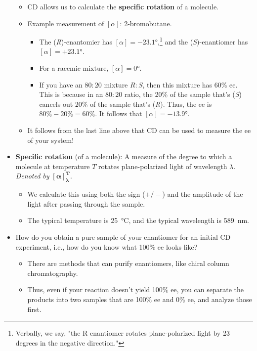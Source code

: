 \documentclass[../notes.tex]{subfiles}
\begin{document}
\begin{itemize}
\begin{itemize}
        \item CD allows us to calculate the \textbf{specific rotation} of a molecule.
        \item Example measurement of $[\alpha]$: 2-bromobutane.
        \begin{itemize}
            \item The (\emph{R})-enantomier has $[\alpha]=\ang{-23.1}$,\footnote{Verbally, we say, "the R enantiomer rotates plane-polarized light by 23 degrees in the negative direction."} and the (\emph{S})-enantiomer has $[\alpha]=+\ang{23.1}$.
            \item For a racemic mixture, $[\alpha]=\ang{0}$.
            \item If you have an $80:20$ mixture $R:S$, then this mixture has 60\% ee. This is because in an $80:20$ ratio, the 20\% of the sample that's (\emph{S}) cancels out 20\% of the sample that's (\emph{R}). Thus, the ee is $80\%-20\%=60\%$. It follows that $[\alpha]=-\ang{13.9}$.
        \end{itemize}
        \item It follows from the last line above that CD can be used to measure the ee of your system!
    \end{itemize}
    \item \textbf{Specific rotation} (of a molecule): A measure of the degree to which a molecule at temperature $T$ rotates plane-polarized light of wavelength $\lambda$. \emph{Denoted by} $\bm{[\alpha]_\lambda^T}$.
    \begin{itemize}
        \item We calculate this using both the sign ($+/-$) and the amplitude of the light after passing through the sample.
        \item The typical temperature is \SI{25}{\celsius}, and the typical wavelength is \SI{589}{\nano\meter}.
    \end{itemize}
    \item How do you obtain a pure sample of your enantiomer for an initial CD experiment, i.e., how do you know what 100\% ee looks like?
    \begin{itemize}
        \item There are methods that can purify enantiomers, like chiral column chromatography.
        \item Thus, even if your reaction doesn't yield 100\% ee, you can separate the products into two samples that are 100\% ee and 0\% ee, and analyze those first.
    \end{itemize}

\end{itemize}
\end{document}
